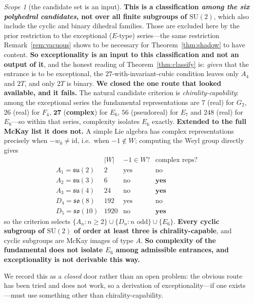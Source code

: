 \documentclass[11pt,reqno]{amsart}
\theoremstyle{plain}
\theoremstyle{definition}
\theoremstyle{remark}
\newtheorem{scope}[theorem]{Scope}
\newcommand{\SU}{\mathrm{SU}}
\newcommand{\su}{\mathfrak{su}}
\newcommand{\so}{\mathfrak{so}}
\begin{document}
\begin{scope}[the candidate set is an input]\label{sc:candidates}
\textbf{This is a classification \emph{among the six polyhedral candidates}, not over
all finite subgroups of $\SU(2)$}, which also include the cyclic and binary dihedral
families. Those are excluded here by the prior restriction to the exceptional
($E$-type) series---the same restriction Remark~\ref{rem:vacuous} shows to be necessary
for Theorem~\ref{thm:shadow} to have content. \textbf{So exceptionality is an input to
this classification and not an output of it}, and the honest reading of
Theorem~\ref{thm:classify} is: \emph{given} that the entrance is to be exceptional, the
$27$-with-invariant-cubic condition leaves only $A_4$ and $2T$, and only $2T$ is binary.
\textbf{We closed the one route that looked available, and it fails.} The natural
candidate criterion is \emph{chirality-capability}: among the exceptional series the
fundamental representations are $7$ (real) for $G_2$, $26$ (real) for $F_4$, $\mathbf{27}$
(\textbf{complex}) for $E_6$, $56$ (pseudoreal) for $E_7$ and $248$ (real) for $E_8$---so
within that series, complexity isolates $E_6$ exactly. \textbf{Extended to the full McKay
list it does not.} A simple Lie algebra has complex representations precisely when
$-w_0\neq\mathrm{id}$, i.e.\ when $-1\notin W$; computing the Weyl group directly gives
\[
  \begin{array}{lccc}
   & |W| & -1\in W? & \text{complex reps?}\\
  A_1=\su(2) & 2 & \text{yes} & \text{no}\\
  A_2=\su(3) & 6 & \text{no} & \textbf{yes}\\
  A_3=\su(4) & 24 & \text{no} & \textbf{yes}\\
  D_4=\so(8) & 192 & \text{yes} & \text{no}\\
  D_5=\so(10) & 1920 & \text{no} & \textbf{yes}
  \end{array}
\]
so the criterion selects $\{A_n:n\ge2\}\cup\{D_n:n\text{ odd}\}\cup\{E_6\}$. \textbf{Every
cyclic subgroup of $\SU(2)$ of order at least three is chirality-capable}, and cyclic
subgroups are McKay images of type $A$. \textbf{So complexity of the fundamental does not
isolate $E_6$ among admissible entrances, and exceptionality is not derivable this way.}

We record this as a \emph{closed} door rather than an open problem: the obvious route has
been tried and does not work, so a derivation of exceptionality---if one exists---must use
something other than chirality-capability.
\end{scope}
\end{document}
